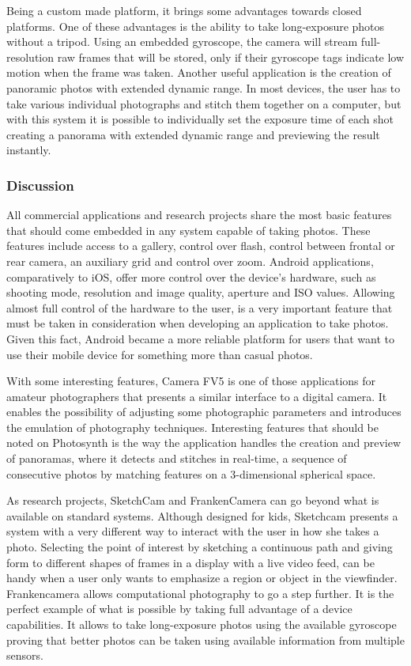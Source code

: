 Being a custom made platform, it brings some advantages towards closed platforms. One of these advantages is the ability to take long-exposure photos without a tripod. Using an embedded gyroscope, the camera will stream full-resolution raw frames that will be stored, only if their gyroscope tags indicate low motion when the frame was taken. 
Another useful application is the creation of panoramic photos with extended dynamic range. In most devices, the user has to take various individual photographs and stitch them together on a computer, but with this system it is possible to individually set the exposure time of each shot creating a panorama with extended dynamic range and previewing the result instantly.

\subsubsection{Discussion}

All commercial applications and research projects share the most basic features that should come embedded in any system capable of taking photos. These features include access to a gallery, control over flash, control between frontal or rear camera, an auxiliary grid and control over zoom.
Android applications, comparatively to iOS, offer more control over the device's hardware, such as shooting mode, resolution and image quality, aperture and ISO values. Allowing almost full control of the hardware to the user, is a very important feature that must be taken in consideration when developing an application to take photos. Given this fact, Android became a more reliable platform for users that want to use their mobile device for something more than casual photos.

With some interesting features, Camera FV5  is one of those applications for amateur photographers that presents a similar interface to a digital camera. It enables the possibility of adjusting some photographic parameters and introduces the emulation of photography techniques.
Interesting features that should be noted on Photosynth is the way the application handles the creation and preview of panoramas, where it detects and stitches in real-time, a sequence of consecutive photos by matching features on a 3-dimensional spherical space.

As research projects, SketchCam and FrankenCamera can go beyond what is available on standard systems. Although designed for kids, Sketchcam presents a system with a very different way to interact with the user in how she takes a photo. Selecting the point of interest by sketching a continuous path and giving form to different shapes of frames in a display with a live video feed, can be handy when a user only wants to emphasize a region or object in the viewfinder.
Frankencamera allows computational photography to go a step further. It is the perfect example of what is possible by taking full advantage of a device capabilities. It allows to take long-exposure photos using the available gyroscope proving that better photos can be taken using available information from multiple sensors.


